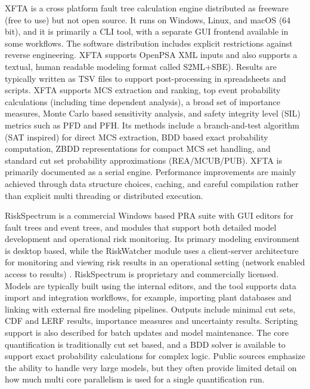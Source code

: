 XFTA \cite{xfta_2011, xfta_2020} is a cross platform fault tree calculation engine distributed as freeware (free to use) but not open source. It runs on Windows, Linux, and macOS (64 bit), and it is primarily a CLI tool, with a separate GUI frontend available in some workflows. The software distribution includes explicit restrictions against reverse engineering. XFTA supports OpenPSA XML inputs and also supports a textual, human readable modeling format called S2ML+SBE). Results are typically written as TSV files to support post-processing in spreadsheets and scripts. XFTA supports MCS extraction and ranking, top event probability calculations (including time dependent analysis), a broad set of importance measures, Monte Carlo based sensitivity analysis, and safety integrity level (SIL) metrics such as PFD and PFH. Its methods include a branch-and-test algorithm (SAT inspired) for direct MCS extraction, BDD based exact probability computation, ZBDD representations for compact MCS set handling, and standard cut set probability approximations (REA/MCUB/PUB). XFTA is primarily documented as a serial engine. Performance improvements are mainly achieved through data structure choices, caching, and careful compilation rather than explicit multi threading or distributed execution.

RiskSpectrum \cite{riskspectrum_website, riskspectrum_1990} is a commercial Windows based PRA suite with GUI editors for fault trees and event trees, and modules that support both detailed model development and operational risk monitoring. Its primary modeling environment is desktop based, while the RiskWatcher module uses a client-server architecture for monitoring and viewing risk results in an operational setting (network enabled access to results) \cite{riskspectrum_2010}. RiskSpectrum is proprietary and commercially licensed. Models are typically built using the internal editors, and the tool supports data import and integration workflows, for example, importing plant databases and linking with external fire modeling pipelines. Outputs include minimal cut sets, CDF and LERF results, importance measures and uncertainty results. Scripting support is also described for batch updates and model maintenance. The core quantification is traditionally cut set based, and a BDD solver is available to support exact probability calculations for complex logic. Public sources emphasize the ability to handle very large models, but they often provide limited detail on how much multi core parallelism is used for a single quantification run.

